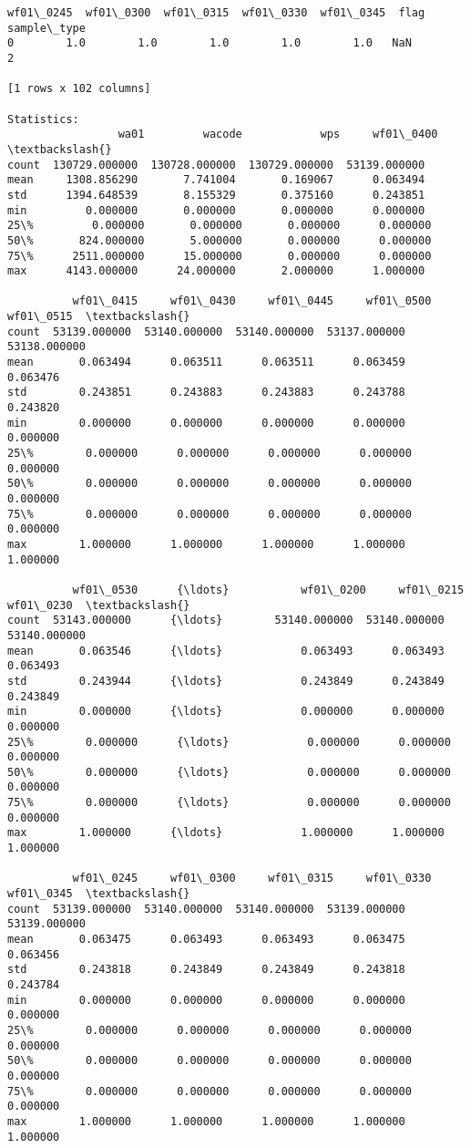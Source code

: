 \documentclass[11pt]{article}
\begin{document}
\begin{Verbatim}[commandchars=\\\{\}]
   wf01\_0245  wf01\_0300  wf01\_0315  wf01\_0330  wf01\_0345  flag  sample\_type  
0        1.0        1.0        1.0        1.0        1.0   NaN            2  

[1 rows x 102 columns]

Statistics: 
                 wa01         wacode            wps     wf01\_0400  \textbackslash{}
count  130729.000000  130728.000000  130729.000000  53139.000000   
mean     1308.856290       7.741004       0.169067      0.063494   
std      1394.648539       8.155329       0.375160      0.243851   
min         0.000000       0.000000       0.000000      0.000000   
25\%         0.000000       0.000000       0.000000      0.000000   
50\%       824.000000       5.000000       0.000000      0.000000   
75\%      2511.000000      15.000000       0.000000      0.000000   
max      4143.000000      24.000000       2.000000      1.000000   

          wf01\_0415     wf01\_0430     wf01\_0445     wf01\_0500     wf01\_0515  \textbackslash{}
count  53139.000000  53140.000000  53140.000000  53137.000000  53138.000000   
mean       0.063494      0.063511      0.063511      0.063459      0.063476   
std        0.243851      0.243883      0.243883      0.243788      0.243820   
min        0.000000      0.000000      0.000000      0.000000      0.000000   
25\%        0.000000      0.000000      0.000000      0.000000      0.000000   
50\%        0.000000      0.000000      0.000000      0.000000      0.000000   
75\%        0.000000      0.000000      0.000000      0.000000      0.000000   
max        1.000000      1.000000      1.000000      1.000000      1.000000   

          wf01\_0530      {\ldots}           wf01\_0200     wf01\_0215     wf01\_0230  \textbackslash{}
count  53143.000000      {\ldots}        53140.000000  53140.000000  53140.000000   
mean       0.063546      {\ldots}            0.063493      0.063493      0.063493   
std        0.243944      {\ldots}            0.243849      0.243849      0.243849   
min        0.000000      {\ldots}            0.000000      0.000000      0.000000   
25\%        0.000000      {\ldots}            0.000000      0.000000      0.000000   
50\%        0.000000      {\ldots}            0.000000      0.000000      0.000000   
75\%        0.000000      {\ldots}            0.000000      0.000000      0.000000   
max        1.000000      {\ldots}            1.000000      1.000000      1.000000   

          wf01\_0245     wf01\_0300     wf01\_0315     wf01\_0330     wf01\_0345  \textbackslash{}
count  53139.000000  53140.000000  53140.000000  53139.000000  53139.000000   
mean       0.063475      0.063493      0.063493      0.063475      0.063456   
std        0.243818      0.243849      0.243849      0.243818      0.243784   
min        0.000000      0.000000      0.000000      0.000000      0.000000   
25\%        0.000000      0.000000      0.000000      0.000000      0.000000   
50\%        0.000000      0.000000      0.000000      0.000000      0.000000   
75\%        0.000000      0.000000      0.000000      0.000000      0.000000   
max        1.000000      1.000000      1.000000      1.000000      1.000000   


\end{Verbatim}
\end{document}
